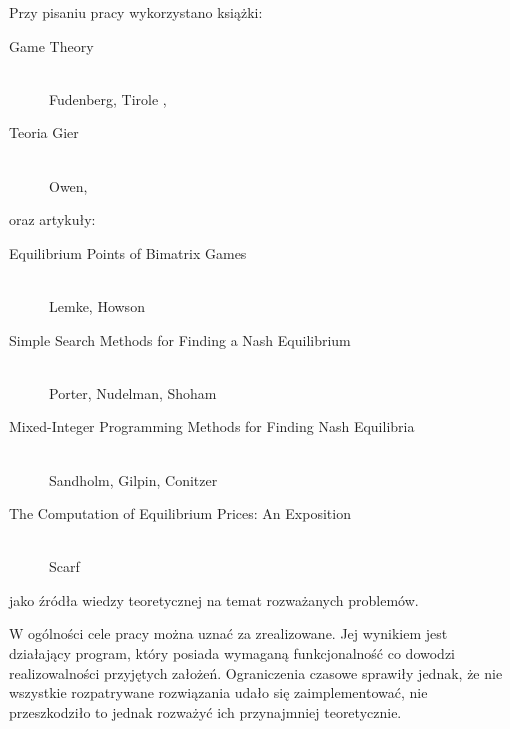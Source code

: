 \documentclass[polish]{standalone}
\begin{document}
Przy pisaniu pracy wykorzystano książki:
\begin{description}
\item[Game Theory] \hfill \\ Fudenberg, Tirole \cite{FT-GT},
\item[Teoria Gier] \hfill \\ Owen, \cite{O-GT}
\end{description}
oraz artykuły:
\begin{description}
\item[Equilibrium Points of Bimatrix Games] \hfill \\ Lemke, Howson \cite{LH-NE}
\item[Simple Search Methods for Finding a Nash Equilibrium] \hfill \\ Porter, Nudelman, Shoham \cite{PNS-NE}
\item[Mixed-Integer Programming Methods for Finding Nash Equilibria] \hfill \\ Sandholm, Gilpin, Conitzer \cite{SCG-NE}
\item[The Computation of Equilibrium Prices: An Exposition] \hfill \\ Scarf \cite{SCARF-NR}
\end{description}
jako źródła wiedzy teoretycznej na temat rozważanych problemów.

W ogólności cele pracy można uznać za zrealizowane. Jej wynikiem jest działający program, który posiada wymaganą
funkcjonalność co dowodzi realizowalności przyjętych założeń. Ograniczenia czasowe sprawiły jednak, że nie wszystkie
rozpatrywane rozwiązania udało się zaimplementować, nie przeszkodziło to jednak rozważyć ich przynajmniej teoretycznie.
\end{document}
